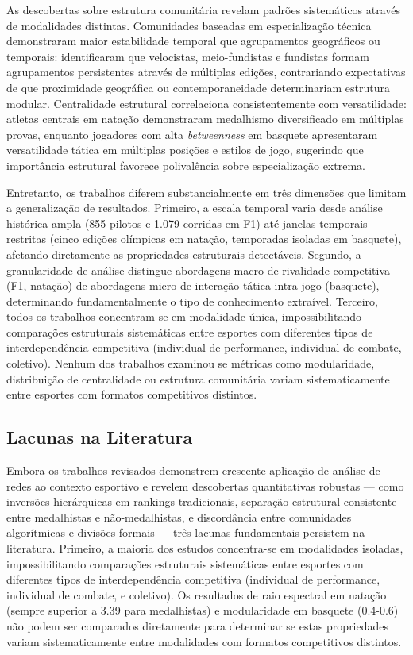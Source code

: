 As descobertas sobre estrutura comunitária revelam padrões sistemáticos através de modalidades distintas. Comunidades baseadas em especialização técnica demonstraram maior estabilidade temporal que agrupamentos geográficos ou temporais:  identificaram que velocistas, meio-fundistas e fundistas formam agrupamentos persistentes através de múltiplas edições, contrariando expectativas de que proximidade geográfica ou contemporaneidade determinariam estrutura modular. Centralidade estrutural correlaciona consistentemente com versatilidade: atletas centrais em natação demonstraram medalhismo diversificado em múltiplas provas, enquanto jogadores com alta \textit{betweenness}{} em basquete apresentaram versatilidade tática em múltiplas posições e estilos de jogo, sugerindo que importância estrutural favorece polivalência sobre especialização extrema.

Entretanto, os trabalhos diferem substancialmente em três dimensões que limitam a generalização de resultados. Primeiro, a escala temporal varia desde análise histórica ampla (855 pilotos e 1.079 corridas em F1) até janelas temporais restritas (cinco edições olímpicas em natação, temporadas isoladas em basquete), afetando diretamente as propriedades estruturais detectáveis. Segundo, a granularidade de análise distingue abordagens macro de rivalidade competitiva (F1, natação) de abordagens micro de interação tática intra-jogo (basquete), determinando fundamentalmente o tipo de conhecimento extraível. Terceiro, todos os trabalhos concentram-se em modalidade única, impossibilitando comparações estruturais sistemáticas entre esportes com diferentes tipos de interdependência competitiva (individual de performance, individual de combate, coletivo). Nenhum dos trabalhos examinou se métricas como modularidade, distribuição de centralidade ou estrutura comunitária variam sistematicamente entre esportes com formatos competitivos distintos.

\subsection{Lacunas na Literatura}

Embora os trabalhos revisados demonstrem crescente aplicação de análise de redes ao contexto esportivo e revelem descobertas quantitativas robustas --- como inversões hierárquicas em rankings tradicionais, separação estrutural consistente entre medalhistas e não-medalhistas, e discordância entre comunidades algorítmicas e divisões formais --- três lacunas fundamentais persistem na literatura. Primeiro, a maioria dos estudos concentra-se em modalidades isoladas, impossibilitando comparações estruturais sistemáticas entre esportes com diferentes tipos de interdependência competitiva (individual de performance, individual de combate, e coletivo). Os resultados de raio espectral em natação (sempre superior a 3.39 para medalhistas) e modularidade em basquete (0.4-0.6) não podem ser comparados diretamente para determinar se estas propriedades variam sistematicamente entre modalidades com formatos competitivos distintos.

